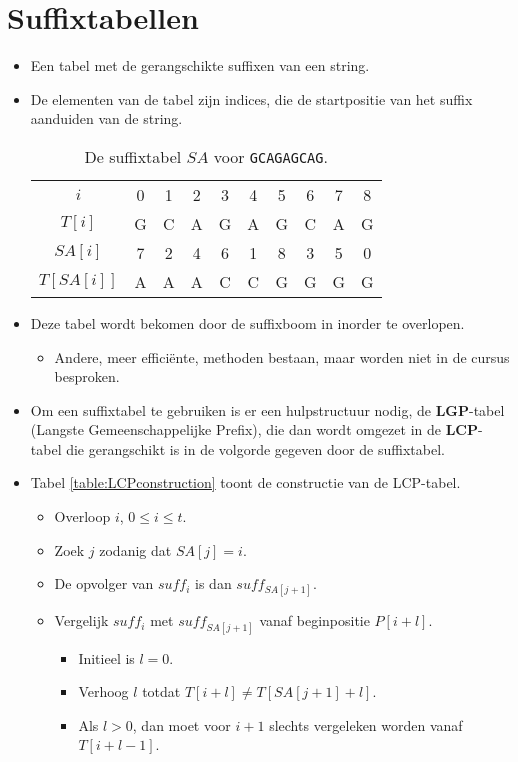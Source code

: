 \section{Suffixtabellen}
\begin{itemize}

    \item Een tabel met de gerangschikte suffixen van een string.
    \item De elementen van de tabel zijn indices, die de startpositie van het suffix aanduiden van de string.
    \begin{table}[ht]
        \centering
        \begin{tabular}{|c|ccccccccc|}
            \hline
            $i$&0&1&2&3&4&5&6&7&8\\
            $T[i]$&G&C&A&G&A&G&C&A&G\\
            \hline
            $SA[i]$&7&2&4&6&1&8&3&5&0\\
            $T[SA[i]]$&A&A&A&C&C&G&G&G&G\\
            \hline
        \end{tabular}
        \caption{De suffixtabel $SA$ voor \texttt{GCAGAGCAG}.}
        \label{table:suffixtabel}
    \end{table}
    \item Deze tabel wordt bekomen door de suffixboom in inorder te overlopen. 
    \begin{itemize}
        \item Andere, meer efficiënte, methoden bestaan, maar worden niet in de cursus besproken.
    \end{itemize}
    \item Om een suffixtabel te gebruiken is er een hulpstructuur nodig, de \textbf{LGP}-tabel (Langste Gemeenschappelijke Prefix), die dan wordt omgezet in de \textbf{LCP}-tabel die gerangschikt is in de volgorde gegeven door de suffixtabel.
    
    \item Tabel \ref{table:LCPconstruction} toont de constructie van de LCP-tabel.
    \begin{itemize}
        \item Overloop $i$, $0 \leq i \leq t$.
        \item Zoek $j$ zodanig dat $SA[j] = i$.
        \item De opvolger van $suff_i$ is dan $suff_{SA[j + 1]}$.
        \item Vergelijk $suff_i$  met $suff_{SA[j + 1]}$ vanaf beginpositie $P[i + l]$.
        \begin{itemize}
            \item Initieel is $l = 0$.
            \item Verhoog $l$ totdat $T[i + l] \neq T[SA[j + 1] + l]$.
            \item Als $l > 0$, dan moet voor $i + 1$ slechts vergeleken worden vanaf $T[i + l - 1]$.
        \end{itemize}
    \end{itemize}
    

\end{itemize}
